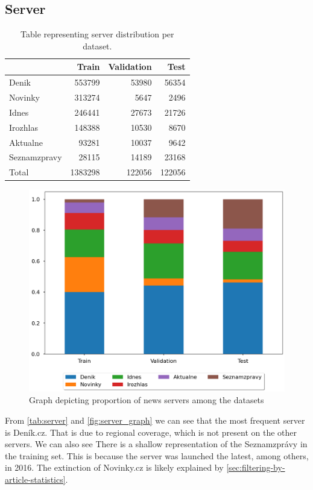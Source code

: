 \subsection{Server}
\begin{table}[h]
    \centering\footnotesize\sf
    \begin{tabular}{lrrr}
        \toprule
        {}           & Train   & Validation & Test   \\
        \midrule
        Denik        & 553799  & 53980      & 56354  \\
        Novinky      & 313274  & 5647       & 2496   \\
        Idnes        & 246441  & 27673      & 21726  \\
        Irozhlas     & 148388  & 10530      & 8670   \\
        Aktualne     & 93281   & 10037      & 9642   \\
        Seznamzpravy & 28115   & 14189      & 23168  \\
        \midrule
        Total        & 1383298 & 122056     & 122056 \\
        \bottomrule
    \end{tabular}
    \caption{Table representing server distribution per dataset.}
    \label{tab:server}
\end{table}
\begin{figure}[h]
    \centering
    \includegraphics[width=.6\linewidth]{img/tasks_graph/server.png}
    \caption{Graph depicting proportion of news servers among the datasets}
    \label{fig:server_graph}
\end{figure}
From \autoref{tab:server} and \autoref{fig:server_graph} we can see that the most frequent server is Deník.cz.
That is due to regional coverage,
which is not present on the other servers. We can also see
There is a shallow representation of the Seznamzprávy in the training set.
This is because the server was launched the latest, among others, in 2016.
The extinction of Novinky.cz is likely explained by \autoref{sec:filtering-by-article-statistics}.


